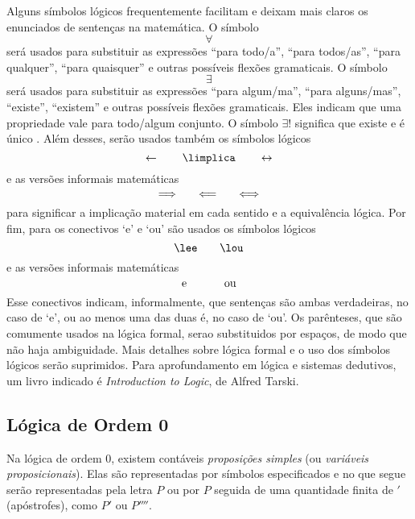 Alguns símbolos lógicos frequentemente facilitam e deixam mais claros os enunciados de sentenças na matemática. O símbolo
	\begin{equation*}
	\forall
	\end{equation*}
será usados para substituir as expressões ``para todo/a'', ``para todos/as'', ``para qualquer'', ``para quaisquer'' e outras possíveis flexões gramaticais. O símbolo
	\begin{equation*}
	\exists
	\end{equation*}
será usados para substituir as expressões ``para algum/ma'', ``para alguns/mas'', ``existe'', ``existem'' e outras possíveis flexões gramaticais. Eles indicam que uma propriedade vale para todo/algum conjunto. O símbolo $\exists!$ significa que existe e é único%
. Além desses, serão usados também os símbolos lógicos
	\begin{equation*}
	\leftarrow \qquad \limplica \qquad \leftrightarrow
	\end{equation*}
e as versões informais matemáticas
	\begin{equation*}
	\quad \Longrightarrow \quad \quad \Longleftarrow \quad \quad \Longleftrightarrow \quad
	\end{equation*}
para significar a implicação material em cada sentido e a equivalência lógica. Por fim, para os conectivos `e' e `ou'  são usados os símbolos lógicos
	\begin{equation*}
	\lee \qquad \lou
	\end{equation*}
e as versões informais matemáticas
	\begin{equation*}
	\text{\ \ e\ \ } \qquad \text{\ \ ou\ \ }
	\end{equation*}
Esse conectivos indicam, informalmente, que sentenças são ambas verdadeiras, no caso de `e', ou ao menos uma das duas é, no caso de `ou'. Os parênteses, que são comumente usados na lógica formal, serao substituidos por espaços, de modo que não haja ambiguidade. Mais detalhes sobre lógica formal e o uso dos símbolos lógicos serão suprimidos. Para aprofundamento em lógica e sistemas dedutivos, um livro indicado é \emph{Introduction to Logic}, de Alfred Tarski.


\subsection{Lógica de Ordem 0}

Na lógica de ordem $0$, existem contáveis \emph{proposições simples} (ou \emph{variáveis proposicionais}). Elas são representadas por símbolos especificados e no que segue serão representadas pela letra $P$ ou por $P$ seguida de uma quantidade finita de $'$ (apóstrofes), como $P'$ ou $P''''$.

